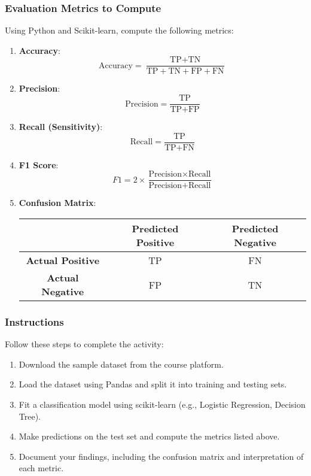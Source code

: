 \documentclass[aspectratio=169]{beamer}
\begin{document}
\begin{frame}[fragile]
    \frametitle{Evaluation Metrics to Compute}
    Using Python and Scikit-learn, compute the following metrics:
    \begin{enumerate}
        \item \textbf{Accuracy}:
        \begin{equation}
            \text{Accuracy} = \frac{\text{TP} + \text{TN}}{\text{TP} + \text{TN} + \text{FP} + \text{FN}}
        \end{equation}
        \pause
        \item \textbf{Precision}:
        \begin{equation}
            \text{Precision} = \frac{\text{TP}}{\text{TP} + \text{FP}}
        \end{equation}
        \pause
        \item \textbf{Recall (Sensitivity)}:
        \begin{equation}
            \text{Recall} = \frac{\text{TP}}{\text{TP} + \text{FN}}
        \end{equation}
        \pause
        \item \textbf{F1 Score}:
        \begin{equation}
            F1 = 2 \times \frac{\text{Precision} \times \text{Recall}}{\text{Precision} + \text{Recall}}
        \end{equation}
        \pause
        \item \textbf{Confusion Matrix}:
        \begin{center}
        \begin{tabular}{|c|c|c|}
            \hline
            & \textbf{Predicted Positive} & \textbf{Predicted Negative} \\
            \hline
            \textbf{Actual Positive} & TP & FN \\
            \hline
            \textbf{Actual Negative} & FP & TN \\
            \hline
        \end{tabular}
        \end{center}
    \end{enumerate}
\end{frame}

\begin{frame}[fragile]
    \frametitle{Instructions}
    Follow these steps to complete the activity:
    \begin{enumerate}
        \item Download the sample dataset from the course platform.
        \item Load the dataset using Pandas and split it into training and testing sets.
        \item Fit a classification model using scikit-learn (e.g., Logistic Regression, Decision Tree).
        \item Make predictions on the test set and compute the metrics listed above.
        \item Document your findings, including the confusion matrix and interpretation of each metric.
    \end{enumerate}
\end{frame}
\end{document}
